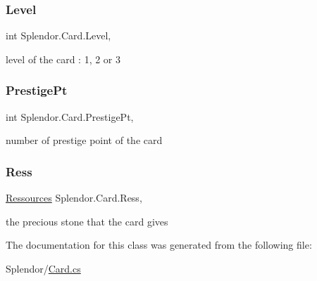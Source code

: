 \mbox{\label{class_splendor_1_1_card_aadc9953aeb322c82e04fbd9b5a3b996d}} 
\subsubsection{\texorpdfstring{Level}{Level}}
{\footnotesize\ttfamily int Splendor.\+Card.\+Level\hspace{0.3cm}{\ttfamily [get]}, {\ttfamily [set]}}



level of the card \+: 1, 2 or 3 

\mbox{\label{class_splendor_1_1_card_a117119ceac083b7b7d39f11e5bbd7225}} 
\subsubsection{\texorpdfstring{Prestige\+Pt}{PrestigePt}}
{\footnotesize\ttfamily int Splendor.\+Card.\+Prestige\+Pt\hspace{0.3cm}{\ttfamily [get]}, {\ttfamily [set]}}



number of prestige point of the card 

\mbox{\label{class_splendor_1_1_card_afcfaa7ea5072b3cd30c04adddc8dd5c7}} 
\subsubsection{\texorpdfstring{Ress}{Ress}}
{\footnotesize\ttfamily \hyperlink{namespace_splendor_abc955fe800ad5f701f777df0a2a29dc2}{Ressources} Splendor.\+Card.\+Ress\hspace{0.3cm}{\ttfamily [get]}, {\ttfamily [set]}}



the precious stone that the card gives 



The documentation for this class was generated from the following file\+:\begin{DoxyCompactItemize}
\item 
Splendor/\hyperlink{_card_8cs}{Card.\+cs}\end{DoxyCompactItemize}

